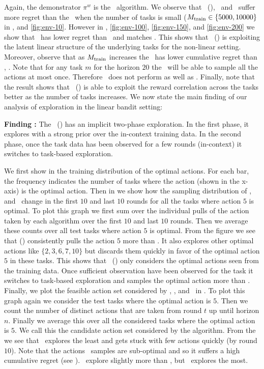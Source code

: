 \documentclass[10pt]{article}
\theoremstyle{plain}
\theoremstyle{definition}
\theoremstyle{remark}
\newcounter{findingcounter}
\newcommand{\customfinding}[1][\normalfont]{\stepcounter{findingcounter}\textbf{Finding \thefindingcounter:}#1 }
\begin{document}
Again, the demonstrator $\pi^w$ is the \ts\ algorithm. We observe that \pred\ (\gt), \ad\ and \dptg\ suffer more regret than the \linucb\ when the number of tasks is small ($M_{\text{train}}\in\{5000, 10000\}$ in , and \ref{fig:env-10}. However in , \ref{fig:env-100}, \ref{fig:env-150}, and \ref{fig:env-200} we show that \pred\ has lower regret than \ts\ and matches \linucb. This shows that \pred\ (\gt) is exploiting the latent linear structure of the underlying tasks for the non-linear setting.
Moreover, observe that as $M_{\text{train}}$ increases the \pred\ has lower cumulative regret than \dptg, \ad. Note that for any task $m$ for the horizon $20$ the \ts\ will be able to sample all the actions at most once. Therefore \dptg\ does not perform as well as \pred.
Finally, note that the result shows that \pred\ (\gt) is able to exploit the reward correlation across the tasks better as the number of tasks increases.
We now state the main finding of our analysis of exploration in the linear bandit setting:
\begin{tcolorbox}
\customfinding The \pred\ (\gt) has an implicit two-phase exploration. In the first phase, it explores with a strong prior over the in-context training data. In the second phase, once the task data has been observed for a few rounds (in-context) it switches to task-based exploration.
\end{tcolorbox}
We first show in  the training distribution of the optimal actions. For each bar, the frequency indicates the number of tasks where the action (shown in the x-axis) is the optimal action.
Then in  we show how the sampling distribution of \dptg, \pred\, and \predt\ change in the first $10$ and last $10$ rounds for all the tasks where action $5$ is optimal. To plot this graph we first sum over the individual pulls of the action taken by each algorithm over the first $10$ and last $10$ rounds. Then we average these counts over all test tasks where action $5$ is optimal. From the figure  we see that \pred (\gt) consistently pulls the action $5$ more than \dptg. It also explores other optimal actions like $\{2,3,6,7,10\}$ but discards them quickly in favor of the optimal action $5$ in these tasks. This shows that \pred\ (\gt) only considers the optimal actions seen from the training data. Once sufficient observation have been observed for the task it switches to task-based exploration and samples the optimal action more than \dptg.
Finally, we plot the feasible action set considered by \dptg, \pred, and \predt\ in . To plot this graph again we consider the test tasks where the optimal action is $5$. Then we count the number of distinct actions that are taken from round $t$ up until horizon $n$. Finally we average this over all the considered tasks where the optimal action is $5$. We call this the candidate action set considered by the algorithm. From the  we see that \dptg\ explores the least and gets stuck with few actions quickly (by round $10$). Note that the actions \dptg\ samples are sub-optimal and so it suffers a high cumulative regret (see ).  \pred\ explore slightly more than \dptg, but \predt\ explores the most.
\end{document}
